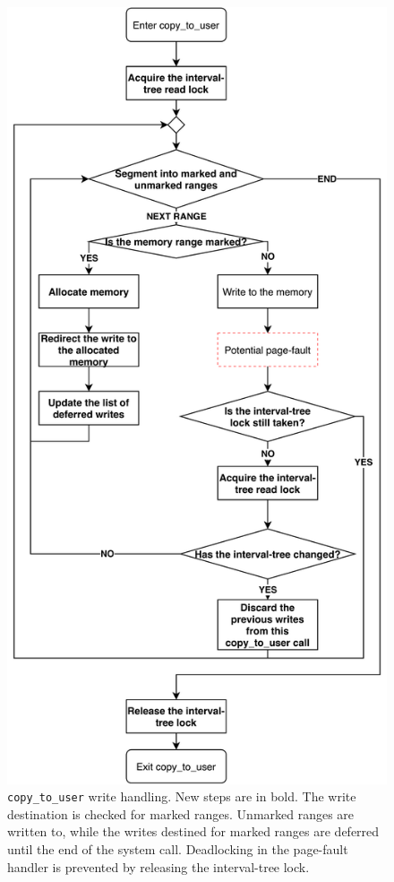 \documentclass[conference]{IEEEtran}
\begin{document}
\label{subsec:kernelland}
\begin{figure}[]
  \centering
  \includegraphics[width = 0.8\linewidth]{img/copy_to_user.pdf}
  \caption{\texttt{copy\_to\_user} write handling. New steps are in bold.
  The write destination is checked for marked ranges. Unmarked ranges are written to, while
  the writes destined for marked ranges are deferred until the end of the system call. Deadlocking
  in the page-fault handler is prevented by releasing the interval-tree lock.
}
  \label{fig:copytouser}
\end{figure}
\end{document}

